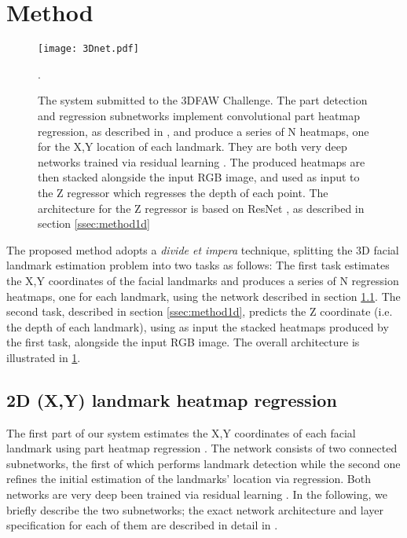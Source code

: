 \documentclass[runningheads]{llncs}
\begin{document}
\section{Method}\label{sec:method}
\vspace{-2em}
\begin{figure}
	\centering 
    \hspace{-1em}
    \vspace{-1em}
	\texttt{[image: 3Dnet.pdf]}
	\caption{The system submitted to the 3DFAW Challenge. The part detection and regression subnetworks implement convolutional part heatmap regression, as described in \cite{myECCV2016}, and produce a series of N heatmaps, one for the X,Y location of each landmark. They are both very deep networks trained via residual learning \cite{he2016identity}. The produced heatmaps are then stacked alongside the input RGB image, and used as input to the Z regressor which regresses the depth of each point. The architecture for the Z regressor is based on ResNet \cite{he2016identity}, as described in section \ref{ssec:method1d}}.
	\label{fig:Our3DNET}
\end{figure} 

The proposed method adopts a \textit{divide et impera} technique, splitting the 3D facial landmark estimation problem into two tasks as follows: The first task estimates the X,Y coordinates of the facial landmarks and produces a series of N regression heatmaps, one for each landmark, using the network described in section \ref{ssec:method2d}. The second task, described in section \ref{ssec:method1d}, predicts the Z coordinate (i.e. the depth of each landmark), using as input the stacked heatmaps produced by the first task, alongside the input RGB image. The overall architecture is illustrated in \figurename{\ref{fig:Our3DNET}}.


\subsection{2D (X,Y) landmark heatmap regression}\label{ssec:method2d}

The first part of our system estimates the X,Y coordinates of each facial landmark using part heatmap regression \cite{myECCV2016}. The network consists of two connected subnetworks, the first of which performs landmark detection while the second one refines the initial estimation of the landmarks' location via regression. Both networks are very deep been trained via residual learning \cite{he2015deep,he2016identity}. In the following, we briefly describe the two subnetworks; the exact network architecture and layer specification for each of them are described in detail in \cite{myECCV2016}. 
\end{document}
